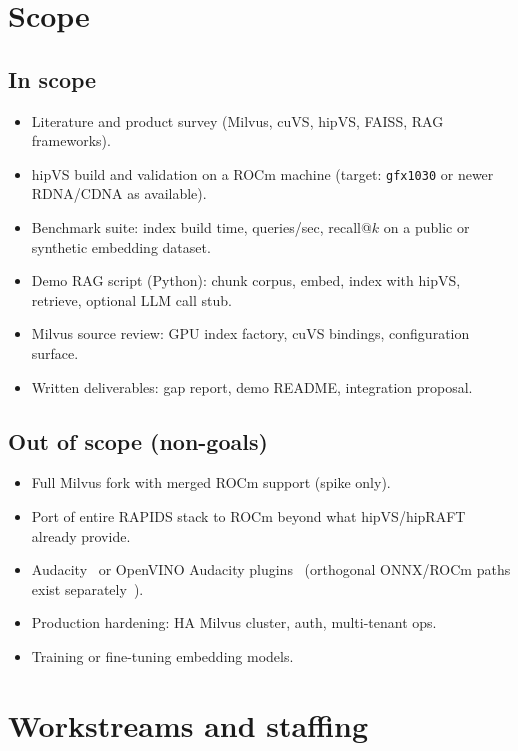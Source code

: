 \documentclass[11pt,a4paper]{article}
\begin{document}
\section{Scope}
\label{sec:scope}

\subsection{In scope}

\begin{itemize}[leftmargin=*]
  \item Literature and product survey (Milvus, cuVS, hipVS, FAISS, RAG frameworks).
  \item hipVS build and validation on a ROCm machine (target: \texttt{gfx1030} or
        newer RDNA/CDNA as available).
  \item Benchmark suite: index build time, queries/sec, recall@$k$ on a public or
        synthetic embedding dataset.
  \item Demo RAG script (Python): chunk corpus, embed, index with hipVS, retrieve,
        optional LLM call stub.
  \item Milvus source review: GPU index factory, cuVS bindings, configuration surface.
  \item Written deliverables: gap report, demo README, integration proposal.
\end{itemize}

\subsection{Out of scope (non-goals)}

\begin{itemize}[leftmargin=*]
  \item Full Milvus fork with merged ROCm support (spike only).
  \item Port of entire RAPIDS stack to ROCm beyond what hipVS/hipRAFT already provide.
  \item Audacity~\cite{audacity-home} or OpenVINO Audacity
        plugins~\cite{openvino-audacity} (orthogonal ONNX/ROCm paths exist
        separately~\cite{onnxruntime-rocm}).
  \item Production hardening: HA Milvus cluster, auth, multi-tenant ops.
  \item Training or fine-tuning embedding models.
\end{itemize}

\section{Workstreams and staffing}
\label{sec:workstreams}
\end{document}
